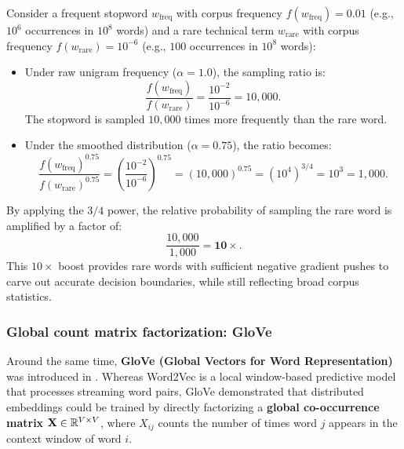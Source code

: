 \documentclass[../../main.tex]{subfiles}
\begin{document}
Consider a frequent stopword $w_{\text{freq}}$ with corpus frequency $f(w_{\text{freq}}) = 0.01$ (e.g., $10^6$ occurrences in $10^8$ words) and a rare technical term $w_{\text{rare}}$ with corpus frequency $f(w_{\text{rare}}) = 10^{-6}$ (e.g., $100$ occurrences in $10^8$ words):
\begin{itemize}
    \item Under raw unigram frequency ($\alpha = 1.0$), the sampling ratio is:
    \begin{equation}
    \label{eq:ratio_raw}
    \frac{f(w_{\text{freq}})}{f(w_{\text{rare}})} = \frac{10^{-2}}{10^{-6}} = 10{,}000.
    \end{equation}
    The stopword is sampled $10{,}000$ times more frequently than the rare word.
    
    \item Under the smoothed distribution ($\alpha = 0.75$), the ratio becomes:
    \begin{equation}
    \label{eq:ratio_smoothed}
    \frac{f(w_{\text{freq}})^{0.75}}{f(w_{\text{rare}})^{0.75}} = \left( \frac{10^{-2}}{10^{-6}} \right)^{0.75} = (10{,}000)^{0.75} = (10^4)^{3/4} = 10^3 = 1{,}000.
    \end{equation}
\end{itemize}
By applying the $3/4$ power, the relative probability of sampling the rare word is amplified by a factor of:
\begin{equation}
\label{eq:boost_factor}
\frac{10{,}000}{1{,}000} = \mathbf{10\times}.
\end{equation}
This $10\times$ boost provides rare words with sufficient negative gradient pushes to carve out accurate decision boundaries, while still reflecting broad corpus statistics.

\subsubsection{Global count matrix factorization: GloVe}
\label{subsec:glove_comparison}

Around the same time, \textbf{GloVe (Global Vectors for Word Representation)} was introduced in \cite{pennington2014glove}. Whereas Word2Vec is a local window-based predictive model that processes streaming word pairs, GloVe demonstrated that distributed embeddings could be trained by directly factorizing a \textbf{global co-occurrence matrix} $\mathbf{X} \in \mathbb{R}^{V \times V}$, where $X_{ij}$ counts the number of times word $j$ appears in the context window of word $i$.
\end{document}

